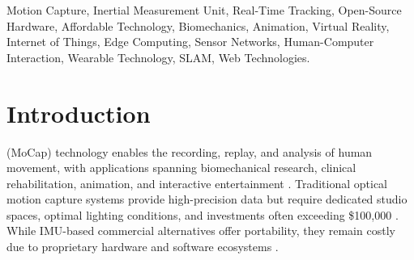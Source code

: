 \documentclass[lettersize,journal]{IEEEtran}
\begin{document}
\begin{abstract}
Motion capture remains costly and complex to deploy, limiting use outside specialized laboratories. We present Mesquite, an open-source, low-cost inertial motion-capture system that combines a body-worn network of 15 IMU sensor nodes with a hip-worn Android smartphone for position tracking. A low-power wireless link streams quaternion orientations to a central USB dongle and a browser-based application for real-time visualization and recording. Built on modern web technologies—WebGL for rendering, WebXR for SLAM, WebSerial and WebSockets for device and network I/O, and Progressive Web Apps for packaging—the system runs cross-platform entirely in the browser. In benchmarks against a commercial optical system, Mesquite achieves mean joint-angle error of 2--5 degrees while operating at approximately 5\% of the cost. The system sustains 30~frames per second with end-to-end latency under 15ms and a packet delivery rate of at least 99.7\% in standard indoor environments. By leveraging IoT principles, edge processing, and a web-native stack, Mesquite lowers the barrier to motion capture for applications in entertainment, biomechanics, healthcare monitoring, human--computer interaction, and virtual reality. We release hardware designs, firmware, and software under an open-source license (GNU GPL).
\end{abstract}

\begin{IEEEkeywords}
  Motion Capture, Inertial Measurement Unit, Real-Time Tracking, Open-Source Hardware, Affordable Technology, Biomechanics, Animation, Virtual Reality, Internet of Things, Edge Computing, Sensor Networks, Human-Computer Interaction, Wearable Technology, SLAM, Web Technologies.
\end{IEEEkeywords}

\section{Introduction}

 (MoCap) technology enables the recording, replay, and analysis of human movement, with applications spanning biomechanical research, clinical rehabilitation, animation, and interactive entertainment \cite{kitagawa2020}. Traditional optical motion capture systems provide high-precision data but require dedicated studio spaces, optimal lighting conditions, and investments often exceeding \$100,000 \cite{meng2021}. While IMU-based commercial alternatives offer portability, they remain costly due to proprietary hardware and software ecosystems \cite{riener2016}.
\end{document}
